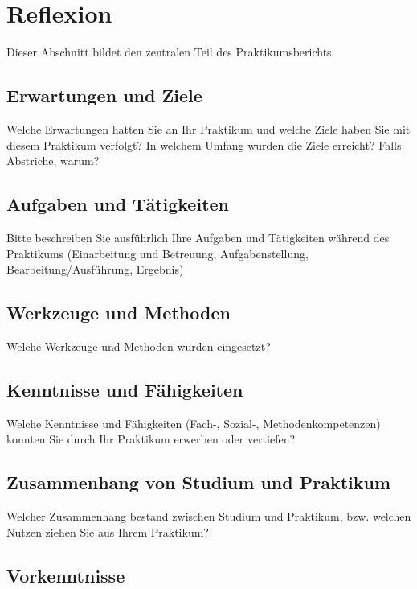 
\chapter{Reflexion}

Dieser Abschnitt bildet den zentralen Teil des Praktikumsberichts.


\section{Erwartungen und Ziele}

Welche Erwartungen hatten Sie an Ihr Praktikum und welche Ziele haben Sie mit diesem Praktikum verfolgt? In welchem Umfang wurden die Ziele erreicht? Falls Abstriche, warum?


\section{Aufgaben und Tätigkeiten}

Bitte beschreiben Sie ausführlich Ihre Aufgaben und Tätigkeiten während des Praktikums (Einarbeitung und Betreuung, Aufgabenstellung, Bearbeitung/Ausführung, Ergebnis)


\section{Werkzeuge und Methoden}

Welche Werkzeuge und Methoden wurden eingesetzt?


\section{Kenntnisse und Fähigkeiten}

Welche Kenntnisse und Fähigkeiten (Fach-, Sozial-, Methodenkompetenzen) konnten Sie durch Ihr Praktikum erwerben oder vertiefen?


\section{Zusammenhang von Studium und Praktikum}

Welcher Zusammenhang bestand zwischen Studium und Praktikum, bzw. welchen Nutzen ziehen Sie aus Ihrem Praktikum?


\section{Vorkenntnisse}

